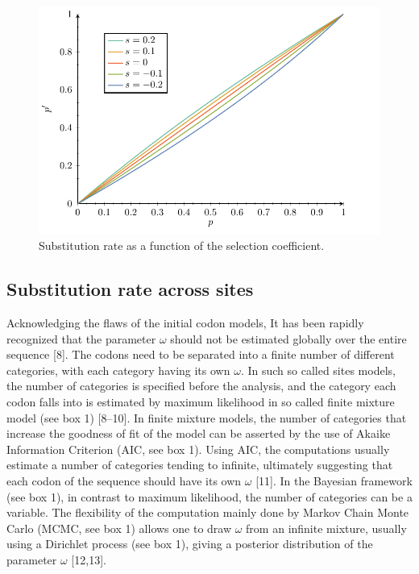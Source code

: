 \begin{figure}[thbp]
	\begin{center}
		\includegraphics[width=\textwidth, page=2] {figures.pdf}
	\end{center}
	\caption{Substitution rate as a function of the selection coefficient.}
\end{figure}

\subsection{Substitution rate across sites}
Acknowledging the flaws of the initial codon models, It has been rapidly recognized that the parameter $\omega$ should not be estimated globally over the entire sequence [8]. The codons need to be separated into a finite number of different categories, with each category having its own $\omega$. In such so called sites models, the number of categories is specified before the analysis, and the category each codon falls into is estimated by maximum likelihood in so called finite mixture model (see box 1) [8–10]. In finite mixture models, the number of categories that increase the goodness of fit of the model can be asserted by the use of Akaike Information Criterion (AIC, see box 1). Using AIC, the computations usually estimate a number of categories tending to infinite, ultimately suggesting that each codon of the sequence should have its own $\omega$ [11]. In the Bayesian framework (see box 1), in contrast to maximum likelihood, the number of categories can be a variable. The flexibility of the computation mainly done by Markov Chain Monte Carlo (MCMC, see box 1) allows one to draw $\omega$ from an infinite mixture, usually using a Dirichlet process (see box 1), giving a posterior distribution of the parameter $\omega$ [12,13]. 

